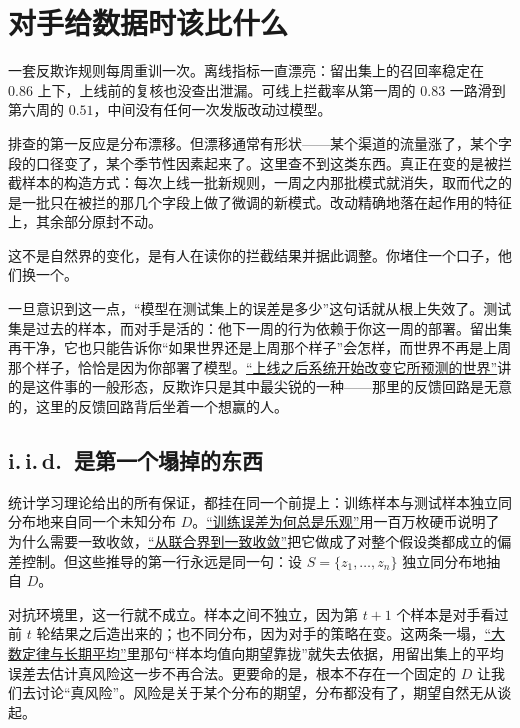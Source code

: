 \section{对手给数据时该比什么}
\label{sec:17-Constrained-Guarantees/04-Online-Learning-and-Regret/01}

一套反欺诈规则每周重训一次。离线指标一直漂亮：留出集上的召回率稳定在 \(0.86\) 上下，上线前的复核也没查出泄漏。可线上拦截率从第一周的 \(0.83\) 一路滑到第六周的 \(0.51\)，中间没有任何一次发版改动过模型。

排查的第一反应是分布漂移。但漂移通常有形状——某个渠道的流量涨了，某个字段的口径变了，某个季节性因素起来了。这里查不到这类东西。真正在变的是被拦截样本的构造方式：每次上线一批新规则，一周之内那批模式就消失，取而代之的是一批只在被拦的那几个字段上做了微调的新模式。改动精确地落在起作用的特征上，其余部分原封不动。

这不是自然界的变化，是有人在读你的拦截结果并据此调整。你堵住一个口子，他们换一个。

一旦意识到这一点，``模型在测试集上的误差是多少''这句话就从根上失效了。测试集是过去的样本，而对手是活的：他下一周的行为依赖于你这一周的部署。留出集再干净，它也只能告诉你``如果世界还是上周那个样子''会怎样，而世界不再是上周那个样子，恰恰是因为你部署了模型。\hyperref[sec:18-Synthesis/01-System-Lifecycle/06]{``上线之后系统开始改变它所预测的世界''}讲的是这件事的一般形态，反欺诈只是其中最尖锐的一种——那里的反馈回路是无意的，这里的反馈回路背后坐着一个想赢的人。

\subsection{i.\,i.\,d.\ 是第一个塌掉的东西}

统计学习理论给出的所有保证，都挂在同一个前提上：训练样本与测试样本独立同分布地来自同一个未知分布 \(D\)。\hyperref[sec:13-Machine-Learning/10-Learning-Theory/01]{``训练误差为何总是乐观''}用一百万枚硬币说明了为什么需要一致收敛，\hyperref[sec:13-Machine-Learning/10-Learning-Theory/02]{``从联合界到一致收敛''}把它做成了对整个假设类都成立的偏差控制。但这些推导的第一行永远是同一句：设 \(S=\{z_1,\dots,z_n\}\) 独立同分布地抽自 \(D\)。

对抗环境里，这一行就不成立。样本之间不独立，因为第 \(t+1\) 个样本是对手看过前 \(t\) 轮结果之后造出来的；也不同分布，因为对手的策略在变。这两条一塌，\hyperref[sec:05-Probability/08-Limit-Theorems/02]{``大数定律与长期平均''}里那句``样本均值向期望靠拢''就失去依据，用留出集上的平均误差去估计真风险这一步不再合法。更要命的是，根本不存在一个固定的 \(D\) 让我们去讨论``真风险''。风险是关于某个分布的期望，分布都没有了，期望自然无从谈起。

